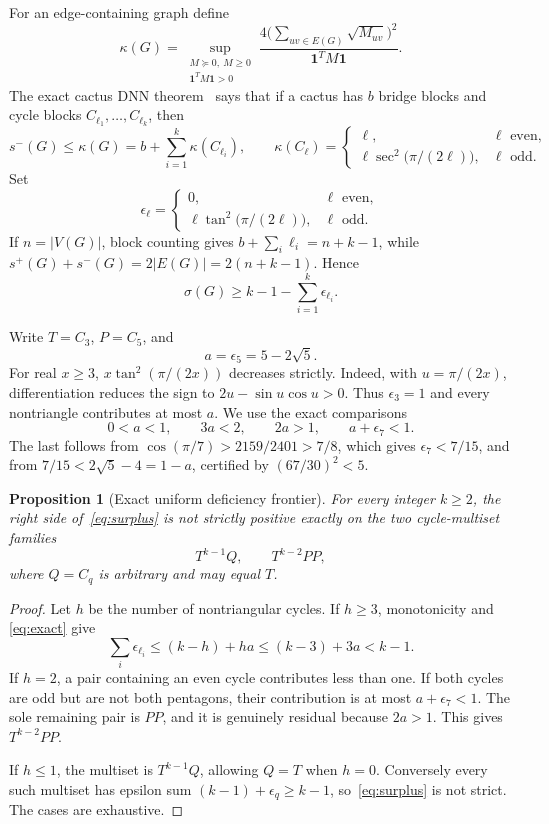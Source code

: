 \documentclass[11pt]{article}
\newtheorem{proposition}[theorem]{Proposition}
\newcommand{\splus}{s^+}
\newcommand{\sminus}{s^-}
\newcommand{\sig}{\sigma}
\newcommand{\one}{\mathbf 1}
\begin{document}
For an edge-containing graph define
\[
 \kappa(G)=\sup_{\substack{M\succeq0,\ M\geq0\\\one^TM\one>0}}
 \frac{4\bigl(\sum_{uv\in E(G)}\sqrt{M_{uv}}\bigr)^2}
      {\one^TM\one}.
\]
The exact cactus DNN theorem~\cite{DNN,LTZ} says that if a cactus has $b$
bridge blocks and cycle blocks $C_{\ell_1},\ldots,C_{\ell_k}$, then
\begin{equation}\label{eq:kappa}
 \sminus(G)\leq\kappa(G)
 =b+\sum_{i=1}^k\kappa(C_{\ell_i}),
 \qquad
 \kappa(C_\ell)=
 \begin{cases}
  \ell,&\ell\text{ even},\\
  \ell\sec^2\!\bigl(\pi/(2\ell)\bigr),&\ell\text{ odd}.
 \end{cases}
\end{equation}
Set
\[
 \epsilon_\ell=
 \begin{cases}
 0,&\ell\text{ even},\\
 \ell\tan^2\!\bigl(\pi/(2\ell)\bigr),&\ell\text{ odd}.
 \end{cases}
\]
If $n=|V(G)|$, block counting gives
$b+\sum_i\ell_i=n+k-1$, while
$\splus(G)+\sminus(G)=2|E(G)|=2(n+k-1)$.  Hence
\begin{equation}\label{eq:surplus}
 \boxed{\sig(G)\geq k-1-\sum_{i=1}^k\epsilon_{\ell_i}.}
\end{equation}

Write $T=C_3$, $P=C_5$, and
\[
 a=\epsilon_5=5-2\sqrt5.
\]
For real $x\geq3$, $x\tan^2(\pi/(2x))$ decreases strictly.  Indeed, with
$u=\pi/(2x)$, differentiation reduces the sign to
$2u-\sin u\cos u>0$.  Thus $\epsilon_3=1$ and every nontriangle contributes
at most $a$.  We use the exact comparisons
\begin{equation}\label{eq:exact}
 0<a<1,\qquad3a<2,\qquad2a>1,
 \qquad a+\epsilon_7<1.
\end{equation}
The last follows from $\cos(\pi/7)>2159/2401>7/8$, which gives
$\epsilon_7<7/15$, and from
$7/15<2\sqrt5-4=1-a$, certified by $(67/30)^2<5$.

\begin{proposition}[Exact uniform deficiency frontier]\label{prop:frontier}
For every integer $k\geq2$, the right side of~\eqref{eq:surplus} is not
strictly positive exactly on the two cycle-multiset families
\[
 \boxed{T^{k-1}Q},\qquad \boxed{T^{k-2}PP},
\]
where $Q=C_q$ is arbitrary and may equal $T$.
\end{proposition}

\begin{proof}
Let $h$ be the number of nontriangular cycles.  If $h\geq3$, monotonicity and
\eqref{eq:exact} give
\[
 \sum_i\epsilon_{\ell_i}\leq(k-h)+ha
 \leq(k-3)+3a<k-1.
\]
If $h=2$, a pair containing an even cycle contributes less than one.  If both
cycles are odd but are not both pentagons, their contribution is at most
$a+\epsilon_7<1$.  The sole remaining pair is $PP$, and it is genuinely
residual because $2a>1$.  This gives $T^{k-2}PP$.

If $h\leq1$, the multiset is $T^{k-1}Q$, allowing $Q=T$ when $h=0$.  Conversely
every such multiset has epsilon sum
$(k-1)+\epsilon_q\geq k-1$, so~\eqref{eq:surplus} is not strict.  The cases
are exhaustive.
\end{proof}
\end{document}
